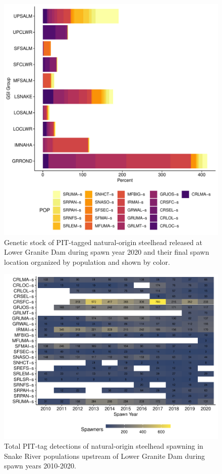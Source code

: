 \documentclass[11pt,a4paper,]{article}
\begin{document}
\begin{figure}
\centering
\includegraphics{Kelt_Summary_files/figure-latex/sum-gsi-pop-count-1.pdf}
\caption{\label{fig:sum-gsi-pop-count}Genetic stock of PIT-tagged natural-origin steelhead released at Lower Granite Dam during spawn year 2020 and their final spawn location organized by population and shown by color.}
\end{figure}

\begin{figure}
\centering
\includegraphics{Kelt_Summary_files/figure-latex/plot-pop-spawners-1.pdf}
\caption{\label{fig:plot-pop-spawners}Total PIT-tag detections of natural-origin steelhead spawning in Snake River populations upstream of Lower Granite Dam during spawn years 2010-2020.}
\end{figure}
\end{document}
